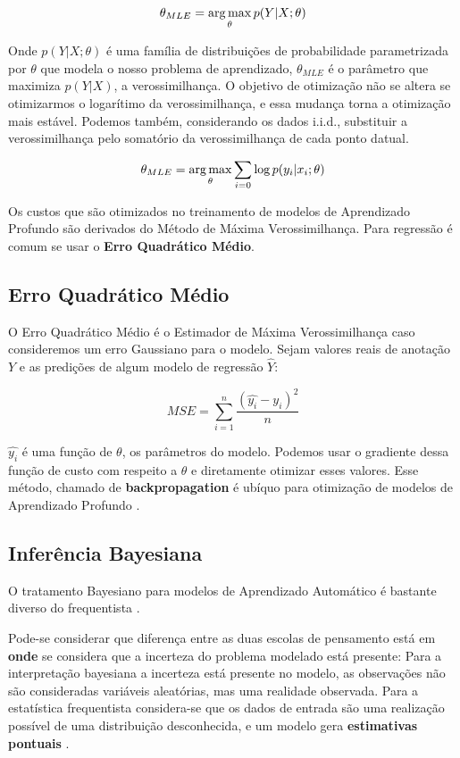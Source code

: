 \[
  \theta_{MLE} = \operatorname*{arg\,max}_{\theta} p( Y | X ; \theta)
\]

Onde $p(Y | X ; \theta)$ é uma família de distribuições de probabilidade
parametrizada por $\theta$ que modela o nosso problema de aprendizado,
$\theta_{MLE}$ é o parâmetro que maximiza $p(Y | X)$, a verossimilhança.
O objetivo de otimização não se altera se otimizarmos o logarítimo da
verossimilhança, e essa mudança torna a otimização mais estável. Podemos também, considerando os dados i.i.d., substituir a verossimilhança pelo somatório da verossimilhança de cada ponto datual.

\begin{equation}
        \label{eq:objver}
  \theta_{MLE} = \operatorname*{arg\,max}_{\theta}\sum_{i=0}\log p( y_i | x_i ; \theta)
\end{equation}


Os custos que são otimizados no treinamento de modelos de Aprendizado Profundo
são derivados do Método de Máxima Verossimilhança. Para regressão é comum se usar o \textbf{Erro
Quadrático Médio}.



\subsection{Erro Quadrático Médio}
\label{sec:MSE}


O Erro Quadrático Médio é o Estimador de Máxima Verossimilhança caso
consideremos um erro Gaussiano para o modelo. Sejam valores reais de anotação $Y$ e as
predições de algum modelo de regressão $\hat{Y}$:

\[MSE = \sum^n_{i=1}\frac{(\hat{y_i} - y_i)^2}{n}\]


$\hat{y_i}$ é uma função de $\theta$, os parâmetros do modelo. Podemos usar o gradiente dessa função de custo com respeito a $\theta$ e diretamente otimizar esses valores. Esse método, chamado de \textbf{backpropagation} é ubíquo para otimização de modelos de Aprendizado Profundo \citep{dlbook}.



\subsection{Inferência Bayesiana} 
\label{sec:bayesinf}
O tratamento Bayesiano para modelos de Aprendizado Automático é bastante diverso do frequentista \citep{dlbook}.

Pode-se considerar que diferença entre as duas escolas de pensamento está em
\textbf{onde} se considera que a incerteza do problema modelado está presente: Para a
interpretação bayesiana a incerteza está presente no modelo, as observações não
são consideradas variáveis aleatórias, mas uma realidade observada. Para a estatística frequentista
considera-se que os dados de entrada são uma realização possível de uma
distribuição desconhecida, e um modelo gera \textbf{estimativas pontuais} \citep{rethink}.

